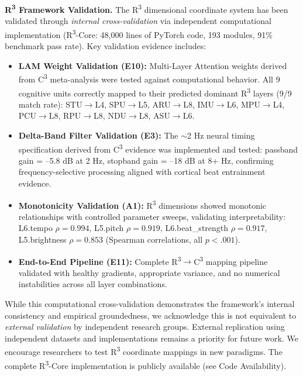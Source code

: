 \documentclass[9pt,onecolumn]{article}
\begin{document}
\textbf{R\textsuperscript{3} Framework Validation.} The R\textsuperscript{3} dimensional coordinate system has been validated through \emph{internal cross-validation} via independent computational implementation (R\textsuperscript{3}-Core: 48,000 lines of PyTorch code, 193 modules, 91\% benchmark pass rate). Key validation evidence includes:

\begin{itemize}[leftmargin=*, topsep=2pt, itemsep=1pt]
    \item \textbf{LAM Weight Validation (E10):} Multi-Layer Attention weights derived from C\textsuperscript{3} meta-analysis were tested against computational behavior. All 9 cognitive units correctly mapped to their predicted dominant R\textsuperscript{3} layers (9/9 match rate): STU$\rightarrow$L4, SPU$\rightarrow$L5, ARU$\rightarrow$L8, IMU$\rightarrow$L6, MPU$\rightarrow$L4, PCU$\rightarrow$L8, RPU$\rightarrow$L8, NDU$\rightarrow$L8, ASU$\rightarrow$L6.
    \item \textbf{Delta-Band Filter Validation (E3):} The $\sim$2 Hz neural timing specification derived from C\textsuperscript{3} evidence \citep{nozaradan2012neural} was implemented and tested: passband gain = --5.8 dB at 2 Hz, stopband gain = --18 dB at 8+ Hz, confirming frequency-selective processing aligned with cortical beat entrainment evidence.
    \item \textbf{Monotonicity Validation (A1):} R\textsuperscript{3} dimensions showed monotonic relationships with controlled parameter sweeps, validating interpretability: L6.tempo $\rho = 0.994$, L5.pitch $\rho = 0.919$, L6.beat\_strength $\rho = 0.917$, L5.brightness $\rho = 0.853$ (Spearman correlations, all $p < .001$).
    \item \textbf{End-to-End Pipeline (E11):} Complete R\textsuperscript{3}$\rightarrow$C\textsuperscript{3} mapping pipeline validated with healthy gradients, appropriate variance, and no numerical instabilities across all layer combinations.
\end{itemize}

While this computational cross-validation demonstrates the framework's internal consistency and empirical groundedness, we acknowledge this is not equivalent to \emph{external validation} by independent research groups. External replication using independent datasets and implementations remains a priority for future work. We encourage researchers to test R\textsuperscript{3} coordinate mappings in new paradigms. The complete R\textsuperscript{3}-Core implementation is publicly available (see Code Availability).
\end{document}
